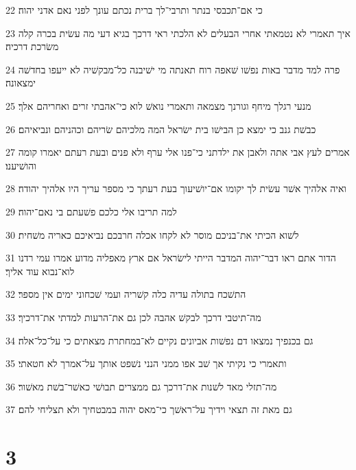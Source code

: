 \par 22 כי אם־תכבסי בנתר ותרבי־לך ברית נכתם עונך לפני נאם אדני יהוה׃
\par 23 איך תאמרי לא נטמאתי אחרי הבעלים לא הלכתי ראי דרכך בגיא דעי מה עשׂית בכרה קלה משׂרכת דרכיה׃
\par 24 פרה למד מדבר באות נפשׁו שׁאפה רוח תאנתה מי ישׁיבנה כל־מבקשׁיה לא ייעפו בחדשׁה ימצאונה׃
\par 25 מנעי רגלך מיחף וגורנך מצמאה ותאמרי נואשׁ לוא כי־אהבתי זרים ואחריהם אלך׃
\par 26 כבשׁת גנב כי ימצא כן הבישׁו בית ישׂראל המה מלכיהם שׂריהם וכהניהם ונביאיהם׃
\par 27 אמרים לעץ אבי אתה ולאבן את ילדתני כי־פנו אלי ערף ולא פנים ובעת רעתם יאמרו קומה והושׁיענו׃
\par 28 ואיה אלהיך אשׁר עשׂית לך יקומו אם־יושׁיעוך בעת רעתך כי מספר עריך היו אלהיך יהודה׃
\par 29 למה תריבו אלי כלכם פשׁעתם בי נאם־יהוה׃
\par 30 לשׁוא הכיתי את־בניכם מוסר לא לקחו אכלה חרבכם נביאיכם כאריה משׁחית׃
\par 31 הדור אתם ראו דבר־יהוה המדבר הייתי לישׂראל אם ארץ מאפליה מדוע אמרו עמי רדנו לוא־נבוא עוד אליך׃
\par 32 התשׁכח בתולה עדיה כלה קשׁריה ועמי שׁכחוני ימים אין מספר׃
\par 33 מה־תיטבי דרכך לבקשׁ אהבה לכן גם את־הרעות למדתי את־דרכיך׃
\par 34 גם בכנפיך נמצאו דם נפשׁות אביונים נקיים לא־במחתרת מצאתים כי על־כל־אלה׃
\par 35 ותאמרי כי נקיתי אך שׁב אפו ממני הנני נשׁפט אותך על־אמרך לא חטאתי׃
\par 36 מה־תזלי מאד לשׁנות את־דרכך גם ממצרים תבושׁי כאשׁר־בשׁת מאשׁור׃
\par 37 גם מאת זה תצאי וידיך על־ראשׁך כי־מאס יהוה במבטחיך ולא תצליחי להם׃

\chapter{3}

